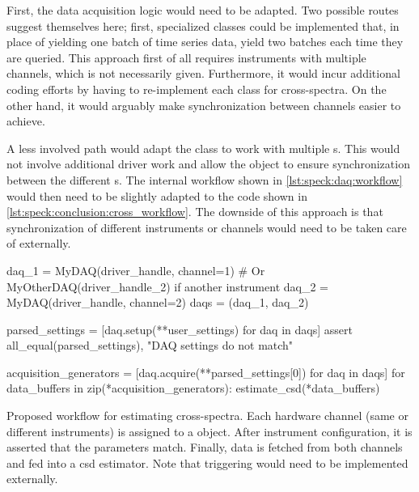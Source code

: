 First, the data acquisition logic would need to be adapted.
Two possible routes suggest themselves here; first, specialized  classes could be implemented that, in place of yielding one batch of time series data, yield two batches each time they are queried.
This approach first of all requires instruments with multiple channels,
which is not necessarily given.
Furthermore, it would incur additional coding efforts by having to re-implement each  class for cross-spectra.
On the other hand, it would arguably make synchronization between channels easier to achieve.

A less involved path would adapt the  class to work with multiple s.
This would not involve additional driver work
and allow the  object to ensure synchronization between the different s.
The internal workflow shown in \cref{lst:speck:daq:workflow} would then need to be slightly adapted to the code shown in \cref{lst:speck:conclusion:cross_workflow}.
The downside of this approach is that synchronization of different instruments or channels would need to be taken care of externally.

\begin{listing}[htpb]
    \begin{py}
        daq_1 = MyDAQ(driver_handle, channel=1)
        # Or MyOtherDAQ(driver_handle_2) if another instrument
        daq_2 = MyDAQ(driver_handle, channel=2)
        daqs = (daq_1, daq_2)

        parsed_settings = [daq.setup(**user_settings) for daq in daqs]
        assert all_equal(parsed_settings), "DAQ settings do not match"

        acquisition_generators = [daq.acquire(**parsed_settings[0])
                                  for daq in daqs]
        for data_buffers in zip(*acquisition_generators):
            estimate_csd(*data_buffers)
    \end{py}
    \caption[Proposed  workflow for cross-spectra]{
        Proposed  workflow for estimating cross-spectra.
        Each hardware channel (same or different instruments) is assigned to a  object.
        After instrument configuration, it is asserted that the parameters match.
        Finally, data is fetched from both channels and fed into a \gls{csd} estimator.
        Note that triggering would need to be implemented externally.
    }
    \label{lst:speck:conclusion:cross_workflow}
\end{listing}

